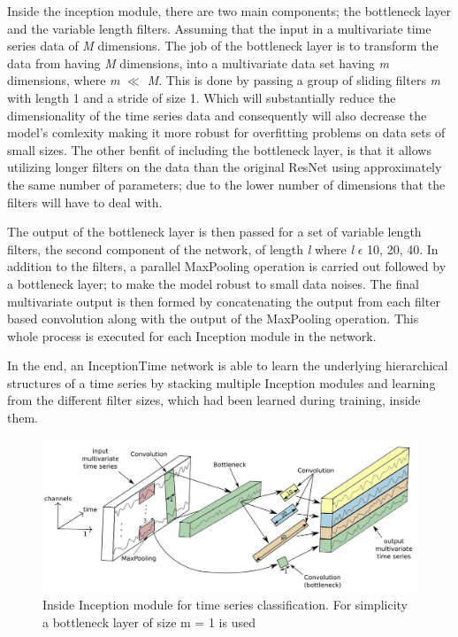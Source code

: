 Inside the inception module, there are two main components; the bottleneck layer and the variable length filters.
Assuming that the input in a multivariate time series data of \emph{M} dimensions. The job of the bottleneck layer is to transform
the data from having \emph{M} dimensions, into a multivariate data set having \emph{m} dimensions, where \emph{m} $\ll$ \emph{M}.
This is done by passing a group of sliding filters \emph{m} with length 1 and a stride of size 1.
Which will substantially reduce the dimensionality of the time series data and consequently will also decrease the model's comlexity
making it more robust for overfitting problems on data sets of small sizes. The other benfit of including the bottleneck layer,
is that it allows utilizing longer filters on the data than the original ResNet using approximately the same number of parameters;
due to the lower number of dimensions that the filters will have to deal with.

The output of the bottleneck layer is then passed for a set of variable length filters, the second component of the network, of length \emph{l}
where \emph{l} $\epsilon$ {10, 20, 40}. In addition to the filters, a parallel MaxPooling operation is carried out followed by a bottleneck layer;
to make the model robust to small data noises. The final multivariate output is then formed by concatenating the output from each filter based convolution
along with the output of the MaxPooling operation. This whole process is executed for each Inception module in the network.

In the end, an InceptionTime network is able to learn the underlying hierarchical structures of a time series by stacking multiple Inception modules
and learning from the different filter sizes, which had been learned during training, inside them.

\begin{figure}
    \captionsetup{justification=raggedright}
    \centering
    \includegraphics[scale = 0.5]{InceptionTime.JPG}
    \centering
    \caption{Inside Inception module for time series classification. For simplicity a bottleneck layer of size m = 1 is used \cite{fawaz2020inceptiontime}}
    \label{Img:InceptionTime}
\end{figure}

